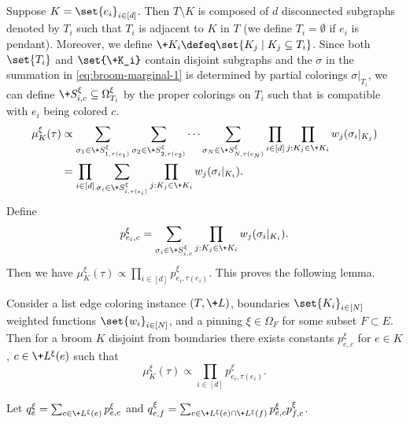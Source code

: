 \documentclass[a4paper,11pt]{article}
\begin{document}
Suppose $K = \set{e_i}_{i\in [d]}$.
Then $T\setminus K$ is composed of $d$ disconnected subgraphs denoted by $T_i$
such that $T_i$ is adjacent to $K$ in $T$ (we define $T_i = \emptyset$
if $e_i$ is pendant).
Moreover, we define $\+K_i\defeq\set{K_j\mid K_j\subseteq T_i}$.
Since both $\set{T_i}$ and $\set{\+K_i}$ contain disjoint subgraphs and 
the $\sigma$ in the summation in \cref{eq:broom-marginal-1}
is determined by partial colorings $\sigma|_{T_i}$,
we can define $\+S^\xi_{i, c}\subseteq \Omega^\xi_{T_i}$ by the proper colorings 
on $T_i$ such that is compatible with $e_i$ being colored $c$.
\begin{align*}
\mu^\xi_K(\tau)
&\propto
  \sum_{\sigma_1\in \+S^\xi_{1, \tau(e_1)}}
  \sum_{\sigma_2\in \+S^\xi_{2, \tau(e_2)}}\dots
  \sum_{\sigma_N\in \+S^\xi_{N, \tau(e_N)}}
  \prod_{i\in [d]} \prod_{j : K_j\in \+K_i} w_j(\sigma_i|_{K_j})\\
&= \prod_{i\in [d]} \sum_{\sigma_i\in \+S^\xi_{i, \tau(e_i)}}
     \prod_{j : K_j\in \+K_i} w_j(\sigma_i|_{K_i}).
\end{align*}
Define 
\[
p^\xi_{e_i,c}=\sum_{\sigma_i\in \+S^\xi_{i, c}}
     \prod_{j : K_j\in \+K_i} w_j(\sigma_i|_{K_i}).
\]
Then we have $\mu^\xi_K(\tau)\propto\prod_{i\in [d]} p^\xi_{e_i,\tau(e_i)}$.
This proves the following lemma.
\begin{lemma}
    Consider a list edge coloring instance $(T, \+L)$,
    boundaries $\set{K_i}_{i\in [N]}$
    weighted functions $\set{w_i}_{i\in [N]}$,
    and a pinning $\xi\in \Omega_{F}$ for some subset $F\subset E$.
    Then for a broom $K$ disjoint from boundaries
    there exists constants $p^\xi_{e, c}$ for $e\in K$, $c\in \+L^\xi(e)$ such that
    \[
    \mu^\xi_K(\tau)\propto\prod_{i\in [d]} p^\xi_{e_i,\tau(e_i)}.
    \]
\end{lemma}

Let $q^\xi_e=\sum_{c\in \+L^\xi(e)} p^\xi_{e,c}$
and $q^\xi_{e,f}=\sum_{c\in \+L^\xi(e)\cap \+L^\xi(f)} p^\xi_{e,c}p^\xi_{f,c}$.
\end{document}
